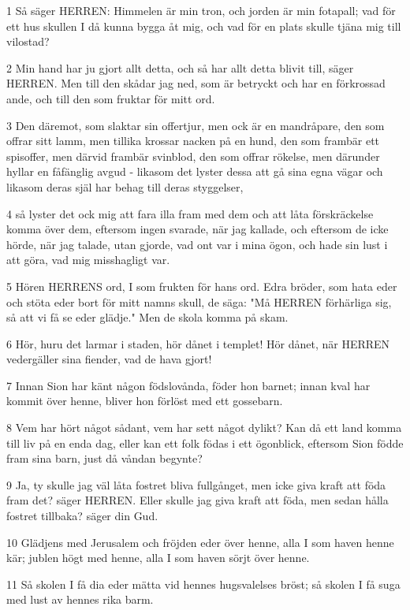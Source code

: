 \par 1 Så säger HERREN: Himmelen är min tron, och jorden är min fotapall; vad för ett hus skullen I då kunna bygga åt mig, och vad för en plats skulle tjäna mig till vilostad?
\par 2 Min hand har ju gjort allt detta, och så har allt detta blivit till, säger HERREN. Men till den skådar jag ned, som är betryckt och har en förkrossad ande, och till den som fruktar för mitt ord.
\par 3 Den däremot, som slaktar sin offertjur, men ock är en mandråpare, den som offrar sitt lamm, men tillika krossar nacken på en hund, den som frambär ett spisoffer, men därvid frambär svinblod, den som offrar rökelse, men därunder hyllar en fåfänglig avgud - likasom det lyster dessa att gå sina egna vägar och likasom deras själ har behag till deras styggelser,
\par 4 så lyster det ock mig att fara illa fram med dem och att låta förskräckelse komma över dem, eftersom ingen svarade, när jag kallade, och eftersom de icke hörde, när jag talade, utan gjorde, vad ont var i mina ögon, och hade sin lust i att göra, vad mig misshagligt var.
\par 5 Hören HERRENS ord, I som frukten för hans ord. Edra bröder, som hata eder och stöta eder bort för mitt namns skull, de säga: "Må HERREN förhärliga sig, så att vi få se eder glädje." Men de skola komma på skam.
\par 6 Hör, huru det larmar i staden, hör dånet i templet! Hör dånet, när HERREN vedergäller sina fiender, vad de hava gjort!
\par 7 Innan Sion har känt någon födslovånda, föder hon barnet; innan kval har kommit över henne, bliver hon förlöst med ett gossebarn.
\par 8 Vem har hört något sådant, vem har sett något dylikt? Kan då ett land komma till liv på en enda dag, eller kan ett folk födas i ett ögonblick, eftersom Sion födde fram sina barn, just då våndan begynte?
\par 9 Ja, ty skulle jag väl låta fostret bliva fullgånget, men icke giva kraft att föda fram det? säger HERREN. Eller skulle jag giva kraft att föda, men sedan hålla fostret tillbaka? säger din Gud.
\par 10 Glädjens med Jerusalem och fröjden eder över henne, alla I som haven henne kär; jublen högt med henne, alla I som haven sörjt över henne.
\par 11 Så skolen I få dia eder mätta vid hennes hugsvalelses bröst; så skolen I få suga med lust av hennes rika barm.
